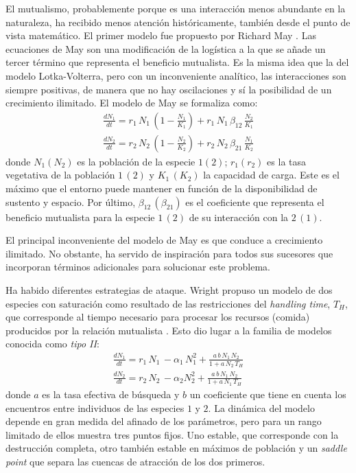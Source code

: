 El mutualismo, probablemente porque es una interacción menos abundante en la naturaleza, ha recibido menos atención históricamente, también desde el punto de vista matemático. El primer modelo fue propuesto por Richard May \cite{may1981models}. Las ecuaciones de May son una modificación de la logística a la que se añade un tercer término que representa el beneficio mutualista. Es la misma idea que la del modelo Lotka-Volterra, pero con un inconveniente analítico, las interacciones son siempre positivas, de manera que no hay oscilaciones y sí la posibilidad de un crecimiento ilimitado. El modelo de May se formaliza como:
\begin{align}
\frac{dN_1}{dt}=r_1 \,N_1\,\left(1-\frac{N_1}{K_1}\right)+r_1\, N_1\,\beta_{12}\, \frac{N_2}{K_1} \nonumber \\ 
\frac{dN_2}{dt}=r_2\, N_2\, \left(1-\frac{N_2}{K_2}\right)+r_2\, N_2\, \beta_{21} \, \frac{N_1}{K_2} 
\label{myeq2}
\end{align}
\noindent donde $N_1(N_2)$ es la población de la especie $1(2)$; $r_1(r_2)$ es la tasa vegetativa de la población $1\, (2)$ y $K_1\, (K_2)$ la capacidad de carga. Este es el máximo que el entorno puede mantener en función de la disponibilidad de sustento y espacio. Por último, $\beta_{12}\,(\beta_{21})$ es el coeficiente que representa el beneficio mutualista para la especie $1\,(2)$ de su interacción con la $2\,(1)$.

El principal inconveniente del modelo de May es que conduce a crecimiento ilimitado. No obstante, ha servido de inspiración para todos sus sucesores que incorporan términos adicionales para solucionar este problema.

Ha habido diferentes estrategias de ataque. Wright propuso un modelo de dos especies con saturación como resultado de las restricciones del \textit{handling time}, $T_H$, que corresponde al tiempo necesario para procesar los recursos (comida) producidos por la relación mutualista \cite{wright1989}. Esto dio lugar a la familia de modelos conocida como \textit{tipo II}:
\begin{align}
\frac{dN_1}{dt}=r_1\, N_1\, - \alpha_1 \, N_1^2+ \frac{a\, b\, N_1\,N_2}{1+ a\, N_2\,T_H} \nonumber\\
\frac{dN_2}{dt}=r_2\, N_2\, - \alpha_2 N_2^2 + \frac{a\,b\,N_1\,N_2}{1+a\, N_1\, T_H}
\label{eq_typeII}
\end{align}
\noindent donde $a$ es la tasa efectiva de búsqueda y $b$ un coeficiente que tiene en cuenta los encuentros entre individuos de las especies $1$ y $2$. La dinámica del modelo depende en gran medida del afinado de los parámetros, pero para un rango limitado de ellos muestra tres puntos fijos. Uno estable, que corresponde con la destrucción completa, otro también estable en máximos de población y un \textit{saddle point} que separa las cuencas de atracción de los dos primeros. 

